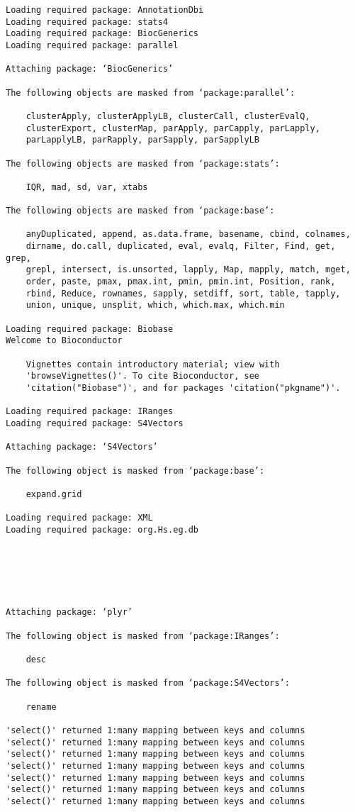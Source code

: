 \documentclass[11pt]{article}
\begin{document}
    \begin{Verbatim}[commandchars=\\\{\}]
Loading required package: AnnotationDbi
Loading required package: stats4
Loading required package: BiocGenerics
Loading required package: parallel

Attaching package: ‘BiocGenerics’

The following objects are masked from ‘package:parallel’:

    clusterApply, clusterApplyLB, clusterCall, clusterEvalQ,
    clusterExport, clusterMap, parApply, parCapply, parLapply,
    parLapplyLB, parRapply, parSapply, parSapplyLB

The following objects are masked from ‘package:stats’:

    IQR, mad, sd, var, xtabs

The following objects are masked from ‘package:base’:

    anyDuplicated, append, as.data.frame, basename, cbind, colnames,
    dirname, do.call, duplicated, eval, evalq, Filter, Find, get, grep,
    grepl, intersect, is.unsorted, lapply, Map, mapply, match, mget,
    order, paste, pmax, pmax.int, pmin, pmin.int, Position, rank,
    rbind, Reduce, rownames, sapply, setdiff, sort, table, tapply,
    union, unique, unsplit, which, which.max, which.min

Loading required package: Biobase
Welcome to Bioconductor

    Vignettes contain introductory material; view with
    'browseVignettes()'. To cite Bioconductor, see
    'citation("Biobase")', and for packages 'citation("pkgname")'.

Loading required package: IRanges
Loading required package: S4Vectors

Attaching package: ‘S4Vectors’

The following object is masked from ‘package:base’:

    expand.grid

Loading required package: XML
Loading required package: org.Hs.eg.db






Attaching package: ‘plyr’

The following object is masked from ‘package:IRanges’:

    desc

The following object is masked from ‘package:S4Vectors’:

    rename

'select()' returned 1:many mapping between keys and columns
'select()' returned 1:many mapping between keys and columns
'select()' returned 1:many mapping between keys and columns
'select()' returned 1:many mapping between keys and columns
'select()' returned 1:many mapping between keys and columns
'select()' returned 1:many mapping between keys and columns
'select()' returned 1:many mapping between keys and columns

    \end{Verbatim}
\end{document}
